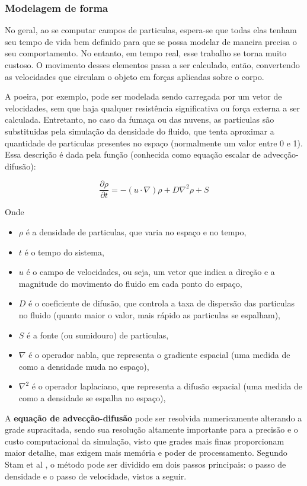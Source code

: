 \subsubsection{Modelagem de forma}
No geral, ao se computar campos de particulas, espera-se que todas elas tenham seu tempo de vida bem definido para que se possa modelar de maneira precisa o seu comportamento. No entanto, em tempo real, esse trabalho se torna muito custoso. O movimento desses elementos passa a ser calculado, então, convertendo as velocidades que circulam o objeto em forças aplicadas sobre o corpo.

A poeira, por exemplo, pode ser modelada sendo carregada por um vetor de velocidades, sem que haja qualquer resistência significativa ou força externa a ser calculada. Entretanto, no caso da fumaça ou das nuvens, as particulas são substituidas pela simulação da densidade do fluido, que tenta aproximar a quantidade de particulas presentes no espaço (normalmente um valor entre 0 e 1). Essa descrição é dada pela função (conhecida como equação escalar de advecção-difusão):

$$
\frac{\partial \rho}{\partial t} = - (u \cdot \nabla) \rho + D \nabla^2 \rho + S
$$

Onde 
\begin{itemize}
  \item $\rho$ é a densidade de particulas, que varia no espaço e no tempo,
  \item $t$ é o tempo do sistema,
  \item $u$ é o campo de velocidades, ou seja, um vetor que indica a direção e a magnitude do movimento do fluido em cada ponto do espaço,
  \item $D$ é o coeficiente de difusão, que controla a taxa de dispersão das particulas no fluido (quanto maior o valor, mais rápido as particulas se espalham),
  \item $S$ é a fonte (ou sumidouro) de particulas,
  \item $\nabla$ é o operador nabla, que representa o gradiente espacial (uma medida de como a densidade muda no espaço),
  \item $\nabla^2$ é o operador laplaciano, que representa a difusão espacial (uma medida de como a densidade se espalha no espaço),
\end{itemize}

A \textbf{equação de advecção-difusão} pode ser resolvida numericamente alterando a grade supracitada, sendo sua resolução altamente importante para a precisão e o custo computacional da simulação, visto que grades mais finas proporcionam maior detalhe, mas exigem mais memória e poder de processamento. Segundo Stam et al \cite{Stam2003}, o método pode ser dividido em dois passos principais: o passo de densidade e o passo de velocidade, vistos a seguir.

